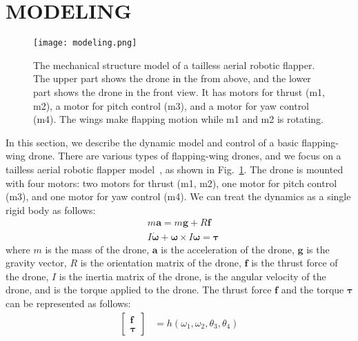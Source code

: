 \section{MODELING}
\label{sec:modeling}

\begin{figure}[!b]
    \centering
    \texttt{[image: modeling.png]}
    \caption{The mechanical structure model of a tailless aerial robotic flapper.
    The upper part shows the drone in the from above, and the lower part shows the drone in the front view.
    It has motors for thrust (m1, m2), a motor for pitch control (m3), and a motor for yaw control (m4).
    The wings make flapping motion while m1 and m2 is rotating.
    }
    \label{figure:modeling}
  \end{figure}

In this section, we describe the dynamic model and control of a basic flapping-wing drone.
There are various types of flapping-wing drones, and we focus on a tailless aerial robotic flapper model~\cite{karasek2018tailless}, as shown in Fig.~\ref{figure:modeling}.
The drone is mounted with four motors: two motors for thrust (m1, m2), one motor for pitch control (m3), and one motor for yaw control (m4).
We can treat the dynamics as a single rigid body as follows:
\begin{equation}
    \begin{aligned}
      &m\bm{a} = m\bm{g} + \bm{\mathit{R}}\bm{f} \\
      &\bm{\mathit{I}}\dot{\bm{\omega}} + \bm{\omega} \times \bm{\mathit{I}}\bm{\omega} = \bm{\tau}
    \end{aligned}
\end{equation}
where $m$ is the mass of the drone, 
$\bm{a}$ is the acceleration of the drone,
$\bm{g}$ is the gravity vector,
$\bm{\mathit{R}}$ is the orientation matrix of the drone,
$\bm{f}$ is the thrust force of the drone,
$\bm{\mathit{I}}$ is the inertia matrix of the drone, 
\bm{$\omega$} is the angular velocity of the drone, 
and \bm{$\tau$} is the torque applied to the drone.
The thrust force $\bm{f}$ and the torque $\bm{\tau}$ can be represented as follows:
\begin{equation}
  \label{eq:control}
  \begin{aligned}
    \begin{bmatrix}
      \bm{f}\\
      \bm{\tau}
    \end{bmatrix}
    &=
    h(\omega_1, \omega_2, \theta_3, \theta_4)\\
  \end{aligned}
\end{equation}
